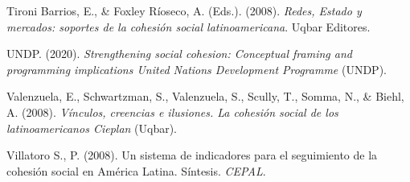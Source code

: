 \documentclass[
  12pt,
]{book}
\begin{document}
\leavevmode\hypertarget{ref-tironibarrios_redes_2008}{}%
Tironi Barrios, E., \& Foxley Ríoseco, A. (Eds.). (2008). \emph{Redes, Estado y mercados: soportes de la cohesión social latinoamericana}. Uqbar Editores.

\leavevmode\hypertarget{ref-undp_strengthening_2020}{}%
UNDP. (2020). \emph{Strengthening social cohesion: Conceptual framing and programming implications \textbar{} United Nations Development Programme} (UNDP).

\leavevmode\hypertarget{ref-valenzuela_vinculos_2008}{}%
Valenzuela, E., Schwartzman, S., Valenzuela, S., Scully, T., Somma, N., \& Biehl, A. (2008). \emph{Vínculos, creencias e ilusiones. La cohesión social de los latinoamericanos Cieplan} (Uqbar).

\leavevmode\hypertarget{ref-villatoros._sistema_2008}{}%
Villatoro S., P. (2008). Un sistema de indicadores para el seguimiento de la cohesión social en América Latina. Síntesis. \emph{CEPAL}.
\end{document}
